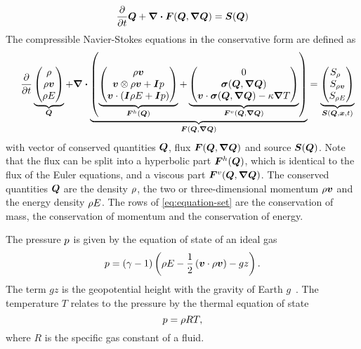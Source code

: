 \documentclass[runningheads]{llncs}
\newcommand{\eqA}{}
\newcommand{\eqB}{(}
\newcommand{\eqMultiA}{(}
\newcommand{\eqMultiB}{)}
\DeclareRobustCommand{\pcrefSingle}[1]{%
\begingroup%
  \renewcommand{\eqA}{(}\renewcommand{\eqB}{}%
\cref{#1}%
\endgroup%
}
\DeclareRobustCommand{\pcrefMulti}[1]{%
\begingroup%
    \renewcommand{\eqMultiA}{}\renewcommand{\eqMultiB}{}%
    (\cref{#1})%
\endgroup%
}
\DeclareRobustCommand{\pcref}[1]{%
\IfSubStr{#1}{,}{\pcrefMulti{#1}}{\pcrefSingle{#1}}%
}
\begin{document}
\begin{equation}
  \label{eq:ns-short}
 \pdv{}{t} \bm{Q} + \divergence{\bm{F}(\bm{Q}, \gradient{\bm{Q}})} = \bm{S}(\bm{Q}) 
\end{equation}
The compressible Navier-Stokes equations in the conservative form are defined as%
\begin{equation}
 \label{eq:equation-set} 
\quad
  \pdv{}{t}
  \underbrace{
  \begin{pmatrix}
    \Qrho\\
    \Qj\\
    \QE
    \end{pmatrix}}_{\Q}
  +
  \divergence{
  \underbrace{
  \left(
   \underbrace{\hyperFluxDef}_{\hyperFlux(\Q)}
+
\underbrace{\viscFluxDef}_{\viscFlux(\Q, \gradQ)}
  \right)}_{\flux(\Q, \gradQ)}}
 =
  \underbrace{
  \begin{pmatrix}
    \source[\Qrho\phantom{\Qrho}]\\
    \source[\Qj]\\
    \source[\QE]
    \end{pmatrix}}_{\source(\Q, \bm{x}, t)}
\end{equation}
with vector of conserved quantities $\bm{Q}$, flux $\flux(\Q, \gradQ)$ and source $\source(\Q)$.
Note that the flux can be split into a hyperbolic part $\bm{F}^{h}(\bm{Q})$,
which is identical to the flux of the Euler equations,
and a viscous part $\viscFlux(\Q, \gradQ)$.
The conserved quantities
\(\bm{Q}\)
are the density $\rho$, the two or three-dimensional momentum $\rho \bm{v}$ and the energy density $\rho E$.
The rows of \cref{eq:equation-set} are the conservation of mass, the conservation of momentum and the conservation of energy.

The pressure $p$ is given by the equation of state of an ideal gas
\begin{equation}
  \label{eq:eos}
  p = (\gamma - 1) \left(\rho E - \frac{1}{2} \left(\bm{v} \cdot \rho \bm{v} \right) - gz \right).
\end{equation}
The term $gz$ is the geopotential height with the gravity of Earth $g$~\cite{giraldo2008study}.
The temperature $T$ relates to the pressure by the thermal equation of state
\begin{equation}
  \label{eq:temperature}
  p = \rho R T,
\end{equation}
where $R$ is the specific gas constant of a fluid.
\end{document}
